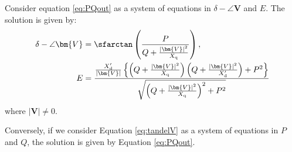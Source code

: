 \documentclass[graybox, envcountchap]{svmult}
\begin{document}
\begin{lemma}\label{lem:delVE}

Consider equation \ref{eq:PQout} as a system of equations in $\delta - \angle
\bm{V}$ and $E$. The solution is given by:
\begin{subequations}\label{eq:tandelV}
  \begin{align}
    \delta - \angle \bm{V} & = \sfarctan  \left( \frac{P}{Q + \tfrac{ |\bm{V}|^2}{X_{\rm q}} } \right) , \label{eq:tandelVa} \\
    E &= \frac{ \tfrac{X_{\rm d}'}{|\bm{V}| } \left\{ \left( Q + \tfrac{|\bm{V}|^2}{X_{\rm q}} \right) \left(Q + \tfrac{|\bm{V}|^2}{X_{\rm d}'} \right) +P^2  \right\} }{  \sqrt{ \left( Q + \tfrac{|\bm{V}|^2}{X_{\rm q}} \right)^2 + P^2 }  } \label{eq:tandelVb}
  \end{align}
  \end{subequations}
where $|\bm{V}|\neq 0$.

Conversely, if we consider Equation \ref{eq:tandelV} as a system of equations in
$P$ and $Q$, the solution is given by Equation \ref{eq:PQout}.
\end{lemma}
\end{document}
